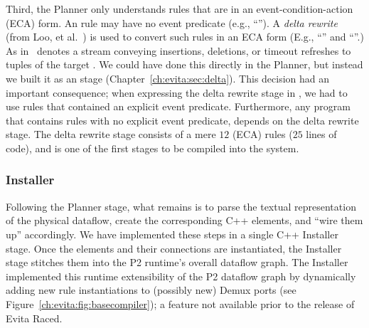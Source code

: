 
Third, the Planner only understands rules that are in an event-condition-action
(ECA) form.  An \OVERLOG rule may have no event predicate (e.g., ``'').  A {\em delta rewrite} (from Loo, et
al.~\cite{loo-sigmod06}) is used to convert such rules in an ECA form (E.g.,
``'' and ``''.) As in~\cite{loo-sigmod06}  denotes a
stream conveying insertions, deletions, or timeout refreshes to tuples of the
target .  We could have done this directly in the Planner, but
instead we built it as an \OVERLOG stage (Chapter~\ref{ch:evita:sec:delta}).
This decision had an important consequence; when expressing the delta rewrite
stage in \OVERLOG, we had to use rules that contained an explicit event
predicate.  Furthermore, any \OVERLOG program that contains rules with no
explicit event predicate, depends on the delta rewrite stage.  The delta
rewrite stage consists of a mere $12$ \OVERLOG (ECA) rules ($25$ lines of
code), and is one of the first \OVERLOG stages to be compiled into the system.
 

\subsubsection{Installer}
\label{ch:evita:sec:installer}

Following the Planner stage, what remains is to parse the textual
representation of the physical dataflow, create the corresponding C++ elements,
and ``wire them up'' accordingly.  We have implemented these steps in a single
C++ Installer stage.  Once the elements and their connections are instantiated,
the Installer stage stitches them into the P2 runtime's overall dataflow graph.
The Installer implemented this runtime extensibility of the P2 dataflow graph
by dynamically adding new rule instantiations to (possibly new) Demux ports
(see Figure~\ref{ch:evita:fig:basecompiler}); a feature not available prior to
the release of Evita Raced.

